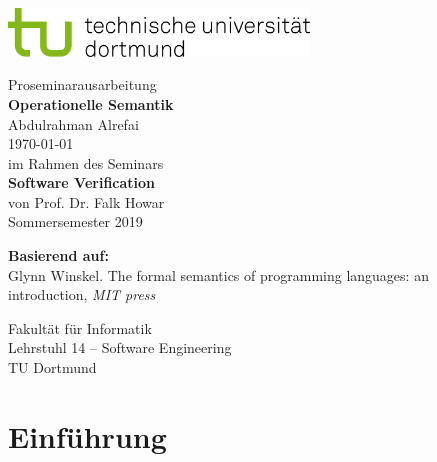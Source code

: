 \documentclass[a4paper,12pt,twoside,headsepline]{scrartcl}
\begin{document}

\begin{titlepage}
\sffamily
\vspace*{-3cm}
\includegraphics[width=8cm]{tud_logo_rgb}

\vspace*{4cm}
\begin{center}
\large
{\Large Proseminarausarbeitung} \\[1ex]
{\LARGE\textbf{Operationelle Semantik}} \\[3ex]
Abdulrahman Alrefai \\[1ex]
\today \\[7ex]
im Rahmen des Seminars \\[1ex]
{\Large\textbf{Software Verification}} \\[1ex]
von Prof. Dr. Falk Howar \\[1ex]
Sommersemester 2019
\end{center}


\noindent
\textbf{Basierend auf:}\\
Glynn Winskel. The formal semantics of programming languages: an introduction, \textit{MIT press}


\vspace*{\fill}
\noindent
Fakultät für Informatik\\
Lehrstuhl 14 -- Software Engineering\\
TU Dortmund
\end{titlepage}


\tableofcontents
\clearpage



\section{Einführung}
\end{document}
